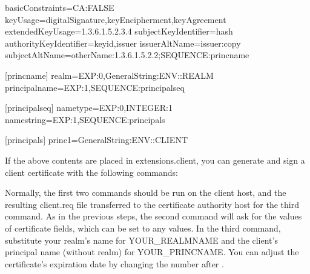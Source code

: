 \documentclass[letterpaper,10pt,english]{sphinxmanual}
\begin{document}
%
\begin{sphinxVerbatim}
basicConstraints=CA:FALSE
keyUsage=digitalSignature,keyEncipherment,keyAgreement
extendedKeyUsage=1.3.6.1.5.2.3.4
subjectKeyIdentifier=hash
authorityKeyIdentifier=keyid,issuer
issuerAltName=issuer:copy
subjectAltName=otherName:1.3.6.1.5.2.2;SEQUENCE:princ\PYGZus{}name

[princ\PYGZus{}name]
realm=EXP:0,GeneralString:\PYGZdl{}\PYGZob{}ENV::REALM\PYGZcb{}
principal\PYGZus{}name=EXP:1,SEQUENCE:principal\PYGZus{}seq

[principal\PYGZus{}seq]
name\PYGZus{}type=EXP:0,INTEGER:1
name\PYGZus{}string=EXP:1,SEQUENCE:principals

[principals]
princ1=GeneralString:\PYGZdl{}\PYGZob{}ENV::CLIENT\PYGZcb{}
\end{sphinxVerbatim}

If the above contents are placed in extensions.client, you can
generate and sign a client certificate with the following commands:

%
\begin{sphinxVerbatim}[commandchars=\\\{\}]
    
      
     \PYGZbs{}
           \PYGZbs{}
        \PYGZbs{}
       
 
\end{sphinxVerbatim}

Normally, the first two commands should be run on the client host, and
the resulting client.req file transferred to the certificate authority
host for the third command.  As in the previous steps, the second
command will ask for the values of certificate fields, which can be
set to any values.  In the third command, substitute your realm’s name
for YOUR\_REALMNAME and the client’s principal name (without realm) for
YOUR\_PRINCNAME.  You can adjust the certificate’s expiration date by
changing the number after .
\end{document}
